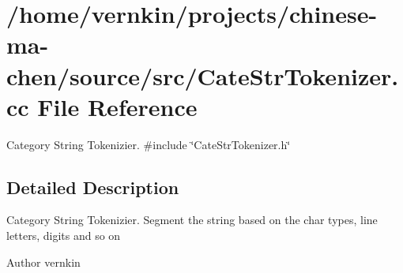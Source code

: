 \section{/home/vernkin/projects/chinese-\/ma-\/chen/source/src/CateStrTokenizer.cc File Reference}
\label{CateStrTokenizer_8cc}


Category String Tokenizier.  
{\ttfamily \#include \char`\"{}CateStrTokenizer.h\char`\"{}}\par


\subsection{Detailed Description}
Category String Tokenizier. Segment the string based on the char types, line letters, digits and so on

\begin{DoxyAuthor}{Author}
vernkin 
\end{DoxyAuthor}
